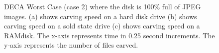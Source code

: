 \documentclass[final,5p,times,twocolumn,authoryear]{elsarticle}
\begin{document}
\begin{figure}%
	\centering
	\qquad
	\qquad
	
	\caption{DECA Worst Case (case 2) where the disk is 100\% full of JPEG images. (a) shows carving speed on a hard disk drive (b) shows carving speed on a sold state drive (c) shows carving speed on a RAMdisk. The x-axis represents time in 0.25 second increments. The y-axis represents the number of files carved.}
	\label{fig:worstCase}
	
\end{figure}
\end{document}
